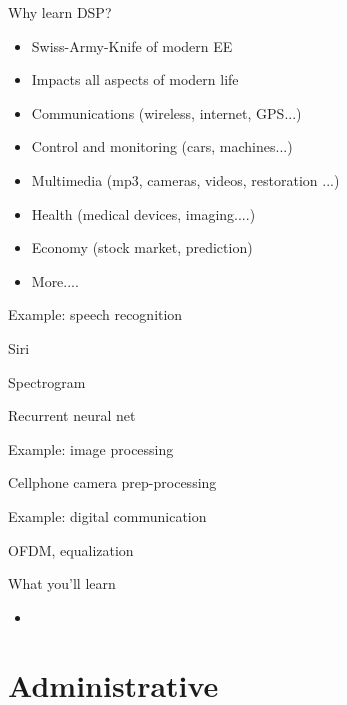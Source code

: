 \documentclass{beamer}
\begin{document}
%
\begin{frame}{Why learn DSP?}

\begin{itemize}
	\item Swiss-Army-Knife of modern EE
    \item Impacts all aspects of modern life
    \item Communications (wireless, internet, GPS...)
    \item Control and monitoring (cars, machines...)
    \item Multimedia (mp3, cameras, videos, restoration ...)
    \item Health (medical devices, imaging....)
    \item Economy (stock market, prediction)
    \item More....
\end{itemize}

\end{frame}

%
\begin{frame}{Example: speech recognition}

Siri

Spectrogram 

Recurrent neural net

\end{frame}

%
\begin{frame}{Example: image processing}

Cellphone camera prep-processing

\end{frame}

%
\begin{frame}{Example: digital communication}

OFDM, equalization

\end{frame}

%
\begin{frame}{What you'll learn}

\begin{itemize}
\item 
\end{itemize}

\end{frame}

\section{Administrative}
\end{document}
